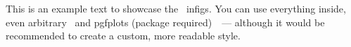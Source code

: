 \documentclass{article}
\begin{document}
This is an example text to showcase the~ infigs.
You can use everything inside, even arbitrary~ and pgfplots (package required)~~--- although it would be recommended to create a custom, more readable style.
\end{document}
